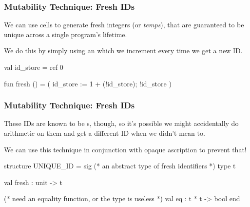\documentclass[aspectratio=169, handout]{beamer}
\begin{document}
\begin{frame}[fragile]
  \frametitle{Mutability Technique: Fresh IDs}

  We can use  cells to generate fresh integers (or \textit{temps}), that
  are guaranteed to be unique across a single program's lifetime.

  \pause
  \vspace{\fill}


  \pause
  \vspace{\fill}

  We do this by simply using an  which we increment every time
  we get a new ID.

  \pause
  \vspace{\fill}

  \begin{codeblock}
    val id_store = ref 0

    fun fresh () =
      ( id_store := 1 + (!id_store);
        !id_store
      )
  \end{codeblock}
\end{frame}

\begin{frame}[fragile]
  \frametitle{Mutability Technique: Fresh IDs}

  These IDs are known to be s, though, so it's possible we might
  accidentally do arithmetic on them and get a different ID when we didn't
  mean to.

  \pause
  \vspace{\fill}

  We can use this technique in conjunction with opaque ascription to prevent
  that!

  \pause
  \vspace{\fill}

  \begin{codeblock}
    structure UNIQUE_ID =
      sig
        (* an abstract type of fresh identifiers *)
        type t

        val fresh : unit -> t

        (* need an equality function, or the type is useless *)
        val eq : t * t -> bool
      end
  \end{codeblock}
\end{frame}
\end{document}
